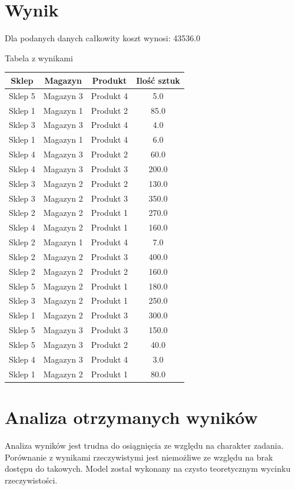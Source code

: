 \documentclass[11pt]{article}
\begin{document}
\section{Wynik}
Dla podanych danych całkowity koszt wynosi:   43536.0\\
\begin{center}
Tabela z wynikami
\end{center}
\begin{center}
	\begin{tabular}{ |c|c|c|c| } 
		\hline
		Sklep	& Magazyn	& Produkt	& Ilość sztuk\\
		\hline
		Sklep 5	& Magazyn 3	& Produkt 4	& 5.0\\
		\hline
		Sklep 1	& Magazyn 1	& Produkt 2	& 85.0\\
		\hline
		Sklep 3	& Magazyn 3	& Produkt 4	& 4.0\\
		\hline
		Sklep 1	& Magazyn 1	& Produkt 4	& 6.0\\
		\hline
		Sklep 4	& Magazyn 3	& Produkt 2	& 60.0\\
		\hline
		Sklep 4	& Magazyn 3	& Produkt 3	& 200.0\\
		\hline
		Sklep 3	& Magazyn 2	& Produkt 2	& 130.0\\
		\hline
		Sklep 3	& Magazyn 2	& Produkt 3	& 350.0\\
		\hline
		Sklep 2	& Magazyn 2	& Produkt 1	& 270.0\\
		\hline
		Sklep 4	& Magazyn 2	& Produkt 1	& 160.0\\
		\hline
		Sklep 2	& Magazyn 1	& Produkt 4	& 7.0\\
		\hline
		Sklep 2	& Magazyn 2	& Produkt 3	& 400.0\\
		\hline
		Sklep 2	& Magazyn 2	& Produkt 2	& 160.0\\
		\hline
		Sklep 5	& Magazyn 2	& Produkt 1	& 180.0\\
		\hline
		Sklep 3	& Magazyn 2	& Produkt 1	& 250.0\\
		\hline
		Sklep 1	& Magazyn 2	& Produkt 3	& 300.0\\
		\hline
		Sklep 5	& Magazyn 3	& Produkt 3	& 150.0\\
		\hline
		Sklep 5	& Magazyn 3	& Produkt 2	& 40.0\\
		\hline
		Sklep 4	& Magazyn 3	& Produkt 4	& 3.0\\
		\hline
		Sklep 1	& Magazyn 2	& Produkt 1	& 80.0\\
		\hline
	\end{tabular}
\end{center}
\section{Analiza otrzymanych wyników}
Analiza wyników jest trudna do osiągnięcia ze względu na charakter zadania. Porównanie z wynikami rzeczywistymi jest niemożliwe ze względu na brak dostępu do takowych. Model został wykonany na czysto teoretycznym wycinku rzeczywistości.
\end{document}
